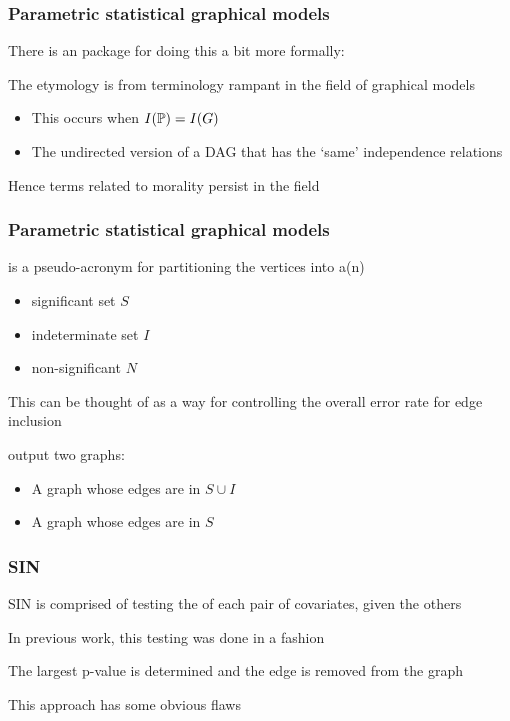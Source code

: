 \documentclass[12pt]{beamer}
\begin{document}
\begin{frame}[fragile]
\frametitle{Parametric statistical graphical models}
There is an  package for doing this a bit more formally: 

\vsp
The etymology is from terminology rampant in the field of graphical models

\begin{itemize}
\item {} This occurs when $I(\P) = I(G)$
\item {} The undirected version of a DAG that has the `same' independence
relations
\end{itemize}
\vsp

Hence terms related to morality persist in the field
\end{frame}

\begin{frame}[fragile]
\frametitle{Parametric statistical graphical models}
 is a pseudo-acronym for partitioning the vertices into a(n)
\begin{itemize}
\item significant set $S$
\item indeterminate set $I$
\item non-significant $N$
\end{itemize}
\vsp

This can be thought of as a way for controlling the overall error rate for  edge inclusion

\vsp
{} output two graphs:

\begin{itemize}
\item A graph whose edges are in $S \cup I$
\item A graph whose edges are in $S$
\end{itemize}
\end{frame}

\begin{frame}[fragile]
\frametitle{SIN}
SIN is comprised of testing the  of each pair of covariates, given the others

\vsp
In previous work, this testing was done in a  fashion

\vsp
The largest p-value is determined and the edge is removed from the graph


\vsp 
This approach has some obvious flaws 

\end{frame}
\end{document}
